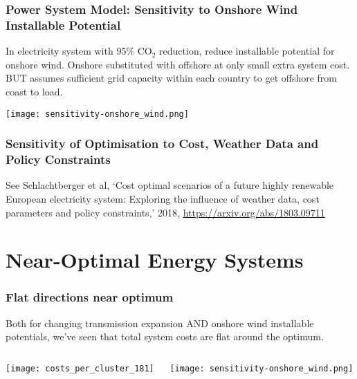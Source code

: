 \documentclass[10pt,aspectratio=169,dvipsnames]{beamer}
\begin{document}
\begin{frame}
  \frametitle{Power System Model: Sensitivity to Onshore Wind Installable Potential}

  In electricity system with 95\% CO$_2$ reduction, reduce installable
  potential for onshore wind. Onshore substituted with offshore at only small
  extra system cost. BUT assumes sufficient grid capacity within each country to get offshore from coast to load.

\centering
    \texttt{[image: sensitivity-onshore\_wind.png]}

\end{frame}


\begin{frame}
  \frametitle{Sensitivity of Optimisation to Cost, Weather Data and Policy Constraints}

  See Schlachtberger et al, `Cost optimal scenarios of a future highly renewable European
  electricity system: Exploring the influence of weather data, cost
  parameters and policy constraints,' 2018,
  \url{https://arxiv.org/abs/1803.09711}

\end{frame}

\section{Near-Optimal Energy Systems}

\begin{frame}
  \frametitle{Flat directions near optimum}

  Both for changing transmission expansion AND onshore wind installable potentials, we've seen that total system costs are \alert{flat around the optimum}.

  \vspace{.5cm}
\begin{columns}[T]

  \begin{column}{6cm}
  \texttt{[image: costs\_per\_cluster\_181]}
  \end{column}
  \begin{column}{8cm}
    \texttt{[image: sensitivity-onshore\_wind.png]}
  \end{column}
\end{columns}

\end{frame}
\end{document}

